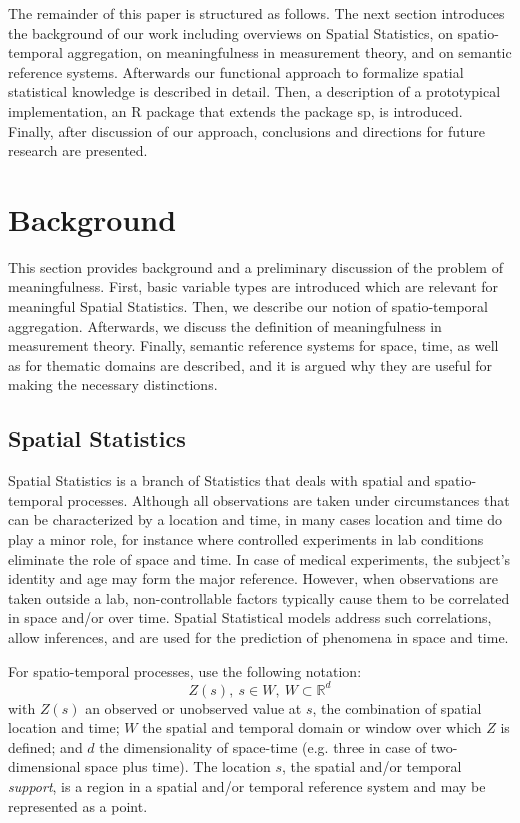 \documentclass[final,authoryear,1p,times]{elsarticle}
\begin{document}
The remainder of this paper is structured as follows. The next section
introduces the background of our work including overviews on Spatial Statistics, on spatio-temporal aggregation, on meaningfulness in measurement theory, and on semantic reference systems. Afterwards our functional approach to formalize spatial statistical knowledge is described in detail. Then, a description of a prototypical implementation, an R package that extends the package sp, is introduced. Finally, after discussion of our approach, conclusions and directions for future research are presented. 

\section{Background} \label{background}

This section provides background and a preliminary discussion of the problem of meaningfulness. First, basic variable types are introduced which are relevant for meaningful Spatial Statistics. Then, we describe our notion of spatio-temporal aggregation. Afterwards, we discuss the definition of meaningfulness in measurement theory. Finally, semantic reference systems for space, time, as well as for thematic domains are described, and it is argued why they are useful for making the necessary distinctions. 

\subsection{Spatial Statistics}
\label{spatStat}

Spatial Statistics \citep{ripley81,cressie93,Cressie2011} is a branch of Statistics that deals with spatial and spatio-temporal processes. Although all observations are taken under circumstances that can be characterized by a location and time, in many cases location and time do play a minor role, for instance where controlled experiments in lab conditions eliminate the role of space and time. In case of medical experiments, the subject's identity and age may form the major reference. However, when observations are taken outside a lab, non-controllable factors typically cause them to be correlated in space and/or over time. Spatial Statistical models address such correlations, allow inferences, and are used for the prediction of phenomena in space and time.

For spatio-temporal processes, \citet{Cressie2011} use the following notation: 
\begin{equation}
Z(s), \ s \in W, \ W \subset \mathbb{R}^d 
\label{eq:st}
\end{equation}
with $Z(s)$ an observed or unobserved value at $s$, the combination of spatial location and time; $W$ the spatial and temporal domain or window over which $Z$ is defined; and $d$ the dimensionality of space-time (e.g. three in case of two-dimensional space plus time). The location $s$, the spatial and/or temporal \textit{support}, is a region in a spatial and/or temporal reference system and may be represented as a point.
\end{document}
